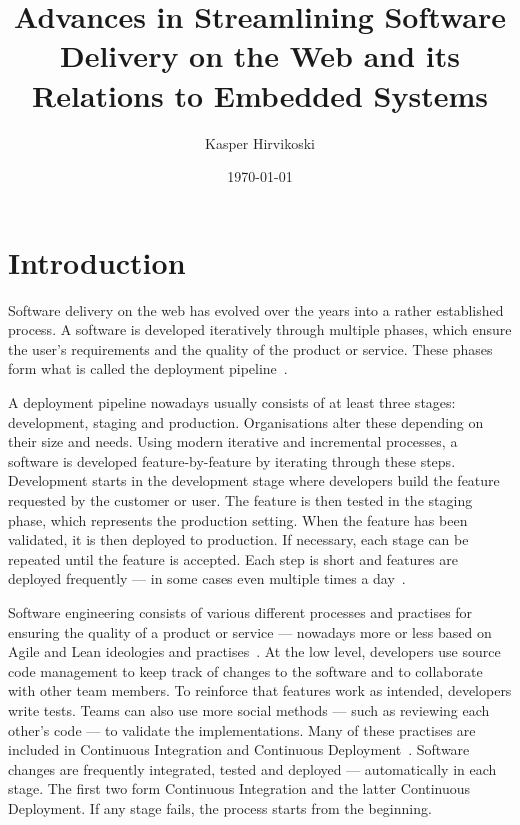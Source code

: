 \documentclass[english]{tktltiki2}
\title{Advances in Streamlining Software Delivery on the Web and its Relations to Embedded Systems}
\author{Kasper Hirvikoski}
\date{\today}
\begin{document}

\frontmatter

\maketitle
\setcounter{page}{2}
\makeabstract

\tableofcontents


\mainmatter


\section{Introduction}

Software delivery on the web has evolved over the years into a rather established process. A software is developed iteratively through multiple phases, which ensure the user’s requirements and the quality of the product or service. These phases form what is called the deployment pipeline~\cite{Fow06, HF11, Fow13a, Fow13b}.

A deployment pipeline nowadays usually consists of at least three stages: development, staging and production. Organisations alter these depending on their size and needs. Using modern iterative and incremental processes, a software is developed feature-by-feature by iterating through these steps. Development starts in the development stage where developers build the feature requested by the customer or user. The feature is then tested in the staging phase, which represents the production setting. When the feature has been validated, it is then deployed to production. If necessary, each stage can be repeated until the feature is accepted. Each step is short and features are deployed frequently — in some cases even multiple times a day~\cite{OR11, Sny13, Rub14}.

Software engineering consists of various different processes and practises for ensuring the quality of a product or service — nowadays more or less based on Agile and Lean ideologies and practises~\cite{Ono88, BBB01a, Fow05, Mon12}. At the low level, developers use source code management to keep track of changes to the software and to collaborate with other team members. To reinforce that features work as intended, developers write tests. Teams can also use more social methods — such as reviewing each other’s code — to validate the implementations. Many of these practises are included in Continuous Integration and Continuous Deployment~\cite{Fow06, HF11, Fow13a, Fow13b}. Software changes are frequently integrated, tested and deployed — automatically in each stage. The first two form Continuous Integration and the latter Continuous Deployment. If any stage fails, the process starts from the beginning.
\end{document}
